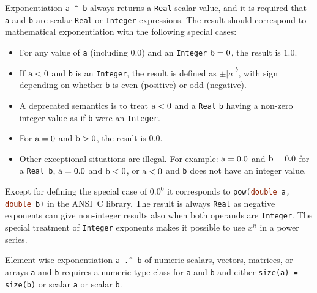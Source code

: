 Exponentiation \lstinline!a ^ b! always returns a \lstinline!Real! scalar value, and it is required that \lstinline!a! and \lstinline!b! are scalar \lstinline!Real! or \lstinline!Integer! expressions.
The result should correspond to mathematical exponentiation with the following special cases:
\begin{itemize}
\item For any value of \lstinline!a! (including $0.0$) and an \lstinline!Integer! $\text{\lstinline!b!} = 0$, the result is $1.0$.
\item If $\text{\lstinline!a!} < 0$ and \lstinline!b! is an \lstinline!Integer!, the result is defined as $\pm |a|^b$, with sign depending on whether \lstinline!b! is even (positive) or odd (negative).
\item A deprecated semantics is to treat $\text{\lstinline!a!} < 0$ and a \lstinline!Real! \lstinline!b! having a non-zero integer value as if \lstinline!b! were an \lstinline!Integer!.
\item For $\text{\lstinline!a!} = 0$ and $\text{\lstinline!b!} > 0$, the result is $0.0$.
\item
  Other exceptional situations are illegal.
  For example: $\text{\lstinline!a!} = 0.0$ and $\text{\lstinline!b!} = 0.0$ for a \lstinline!Real b!, $\text{\lstinline!a!} = 0.0$ and $\text{\lstinline!b!} < 0$, or $\text{\lstinline!a!} < 0$ and \lstinline!b! does not have an integer value.
\end{itemize}

\begin{nonnormative}
Except for defining the special case of $0.0^0$ it corresponds to \lstinline[language=C]!pow(double a, double b)! in the ANSI~C library.
The result is always \lstinline!Real! as negative exponents can give non-integer results also when both operands are \lstinline!Integer!.
The special treatment of \lstinline!Integer! exponents makes it possible to use $x^n$ in a power series.
\end{nonnormative}

Element-wise exponentiation \lstinline!a .^ b! of numeric scalars, vectors, matrices, or arrays \lstinline!a! and \lstinline!b! requires a numeric type class for \lstinline!a! and \lstinline!b! and either \lstinline!size(a) = size(b)! or scalar \lstinline!a! or scalar \lstinline!b!.

